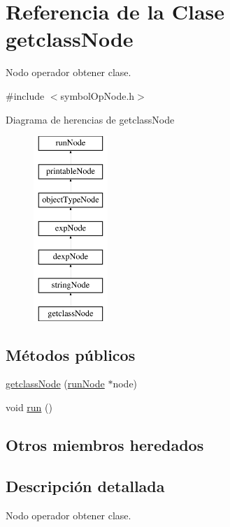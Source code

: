 \hypertarget{classgetclassNode}{\section{Referencia de la Clase getclass\-Node}
\label{classgetclassNode}
}


Nodo operador obtener clase.  




{\ttfamily \#include $<$symbol\-Op\-Node.\-h$>$}

Diagrama de herencias de getclass\-Node\begin{figure}[H]
\begin{center}
\leavevmode
\includegraphics[height=7.000000cm]{classgetclassNode}
\end{center}
\end{figure}
\subsection*{Métodos públicos}
\begin{DoxyCompactItemize}
\item 
\hyperlink{classgetclassNode_af77e1c528afb86fe84a27ad96a6e7cb6}{getclass\-Node} (\hyperlink{classrunNode}{run\-Node} $\ast$node)
\item 
void \hyperlink{classgetclassNode_a3f9d4481bce93bc8a3e8442869a331e5}{run} ()
\end{DoxyCompactItemize}
\subsection*{Otros miembros heredados}


\subsection{Descripción detallada}
Nodo operador obtener clase. 

